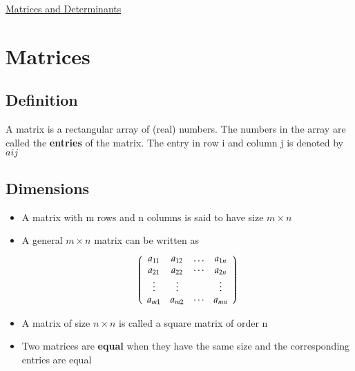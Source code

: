 \documentclass{article}[18pt]
\begin{document}
\begin{center}
\underline{\huge Matrices and Determinants}
\end{center}
\section{Matrices}
\subsection{Definition}
A matrix is a rectangular array of (real) numbers. The numbers in the array are called the \textbf{entries} of the matrix. The entry in row i and column j is denoted by $a{ij}$
\subsection{Dimensions}
\begin{itemize}
	\item A matrix with m rows and n columns is said to have size $m\times n$
	\item A general $m\times n$ matrix can be written as
	$$\left( \begin{array} { c c c c } { a _ { 11 } } & { a _ { 12 } } & { \dots } & { a _ { 1 n } } \\ { a _ { 21 } } & { a _ { 22 } } & { \cdots } & { a _ { 2 n } } \\ { \vdots } & { \vdots } & { } & { \vdots } \\ { a _ { m 1 } } & { a _ { m 2 } } & { \cdots } & { a _ { m n } } \end{array} \right)$$
	\item A matrix of size $n\times n$ is called a square matrix of order n
	\item Two matrices are \textbf{equal} when they have the same size and the corresponding entries are equal
\end{itemize}
\end{document}
